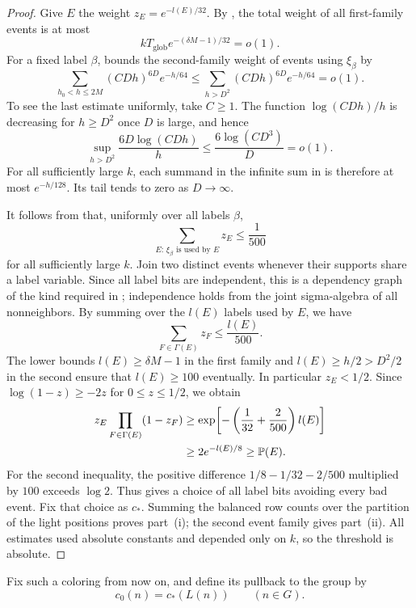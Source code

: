 \begin{proof}
Give $E$ the weight $z_E=e^{-l(E)/32}$. By
, the total weight of all
first-family events is at most
\begin{equation}\label{outer:first-weight}
 kT_{\mathrm{glob}}e^{-(\delta M-1)/32}=o(1).
\end{equation}
For a fixed label $\beta$,  bounds the second-family
weight of events using $\xi_\beta$ by
\begin{equation}\label{outer:second-weight}
 \sum_{h_0<h\le2M}(CDh)^{6D}e^{-h/64}
 \le\sum_{h>D^2}(CDh)^{6D}e^{-h/64}=o(1).
\end{equation}
To see the last estimate uniformly, take $C\ge1$. The function
$\log(CDh)/h$ is decreasing for $h\ge D^2$ once $D$ is large,
and hence
\[
 \sup_{h>D^2}\frac{6D\log(CDh)}{h}
 \le\frac{6\log(CD^3)}{D}=o(1).
\]
For all sufficiently large $k$, each summand in the infinite sum in
 is therefore at most $e^{-h/128}$.
Its tail tends to zero as $D\to\infty$.

It follows from  that,
uniformly over all labels $\beta$,
\begin{equation}\label{outer:incident-weight}
 \sum_{E:\,\xi_\beta\text{ is used by }E}z_E\le\frac1{500}
\end{equation}
for all sufficiently large $k$. Join two distinct events whenever
their supports share a label variable. Since all label bits are
independent, this is a dependency graph of the kind required in
; independence holds from the joint sigma-algebra of
all nonneighbors. By summing  over the
$l(E)$ labels used by $E$, we have
\[
 \sum_{F\in\Gamma(E)}z_F\le\frac{l(E)}{500}.
\]
The lower bounds $l(E)\ge\delta M-1$ in the first family and
$l(E)\ge h/2>D^2/2$ in the second ensure that $l(E)\ge100$
eventually. In particular $z_E<1/2$. Since
$\log(1-z)\ge-2z$ for $0\le z\le1/2$, we obtain
\begin{align}
 z_E\prod_{F\in\Gamma(E)}(1-z_F)
 &\ge\exp\!\left[-\left(\frac1{32}+\frac2{500}\right)l(E)\right]
 \notag\\
 &\ge2e^{-l(E)/8}\ge\mathbb P(E).
 \label{outer:criterion}
\end{align}
For the second inequality, the positive difference
$1/8-1/32-2/500$ multiplied by $100$ exceeds $\log2$.
Thus  gives a choice of all label bits avoiding every
bad event. Fix that choice as $c_*$. Summing the balanced row counts
over the partition of the light positions proves part~\textup{(i)};
the second event family gives part~\textup{(ii)}.
All estimates used absolute constants and depended only on $k$, so
the threshold is absolute.
\end{proof}

Fix such a coloring from now on, and define its pullback to the group by
\begin{equation}\label{outer:pullback}
 c_0(n)=c_*(L(n))\qquad(n\in G).
\end{equation}
